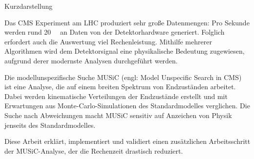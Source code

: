 
\vspace{2cm}
{Kurzdarstellung}
\chapterheadendvskip

Das CMS Experiment am LHC produziert sehr große Datenmengen: Pro Sekunde werden rund \SI{20}{\tera\byte} an Daten von der Detektorhardware generiert. Folglich erfordert auch die Auswertung viel Rechenleistung. Mithilfe mehrerer Algorithmen wird dem Detektorsignal eine physikalische Bedeutung zugewiesen, aufgrund derer modernste Analysen durchgeführt werden.

Die modellunspezifische Suche MUSiC (engl: Model Unspecific Search in CMS) ist eine Analyse, die auf einem breiten Spektrum von Endzuständen arbeitet. Dabei werden kinematische Verteilungen der Endzustände erstellt und mit Erwartungen aus Monte-Carlo-Simulationen des Standardmodelles verglichen. Die Suche nach Abweichungen macht MUSiC sensitiv auf Anzeichen von Physik jenseits des Standardmodelles.

Diese Arbeit erklärt, implementiert und validiert einen zusätzlichen Arbeitsschritt der MUSiC-Analyse, der die Rechenzeit drastisch reduziert.